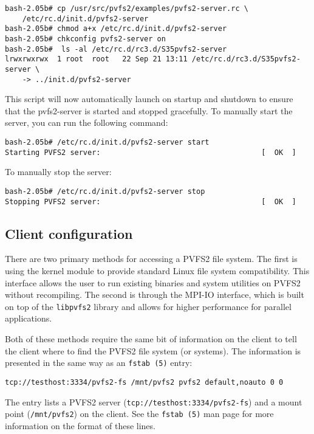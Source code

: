 \documentclass[11pt, letterpaper]{article}
\begin{document}
\begin{verbatim}
bash-2.05b# cp /usr/src/pvfs2/examples/pvfs2-server.rc \
    /etc/rc.d/init.d/pvfs2-server
bash-2.05b# chmod a+x /etc/rc.d/init.d/pvfs2-server
bash-2.05b# chkconfig pvfs2-server on
bash-2.05b#  ls -al /etc/rc.d/rc3.d/S35pvfs2-server 
lrwxrwxrwx  1 root  root   22 Sep 21 13:11 /etc/rc.d/rc3.d/S35pvfs2-server \
    -> ../init.d/pvfs2-server
\end{verbatim}

This script will now automatically launch on startup and shutdown to 
ensure that the pvfs2-server is started and stopped gracefully.
To manually start the server, you can run the following command:

\begin{verbatim}
bash-2.05b# /etc/rc.d/init.d/pvfs2-server start
Starting PVFS2 server:                                     [  OK  ]
\end{verbatim}

To manually stop the server:

\begin{verbatim}
bash-2.05b# /etc/rc.d/init.d/pvfs2-server stop
Stopping PVFS2 server:                                     [  OK  ]
\end{verbatim}

\subsection{Client configuration}
\label{subsec:client}

There are two primary methods for accessing a PVFS2 file system.  The first is
using the kernel module to provide standard Linux file system compatibility.
This interface allows the user to run existing binaries and system utilities
on PVFS2 without recompiling.  The second is through the MPI-IO interface,
which is built on top of the \texttt{libpvfs2} library and allows for higher
performance for parallel applications.

Both of these methods require the same bit of information on the client to
tell the client where to find the PVFS2 file system (or systems).  The
information is presented in the same way as an \texttt{fstab (5)} entry:

\begin{verbatim}
tcp://testhost:3334/pvfs2-fs /mnt/pvfs2 pvfs2 default,noauto 0 0 
\end{verbatim}

The entry lists a PVFS2 server (\texttt{tcp://testhost:3334/pvfs2-fs}) and a
mount point (\texttt{/mnt/pvfs2}) on the client.  See the \texttt{fstab (5)}
man page for more information on the format of these lines.
\end{document}
